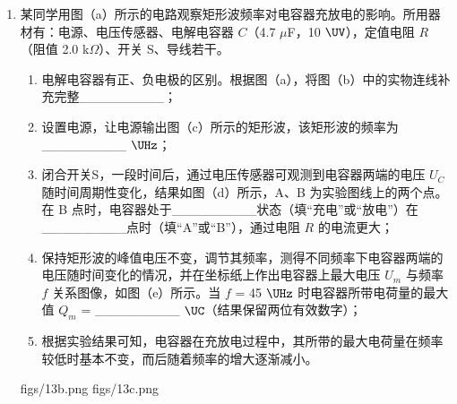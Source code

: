 \documentclass[\gkver]{gaokaozhenti}
\begin{document}
\begin{enumerate}
{ $v_{A}=\frac{d}{\Delta t_{A}}=\frac{5.25\times10^{-3}}{5.25\times10^{-3}}\Ums=1.00\Ums$

（4）挡光片依次经过光电门 A 和 B，由动能定理可得

 $\frac{1}{2}mv_{B}^{2}-\frac{1}{2}mv_{A}^{2}=mgL\sin\theta-\mu mgL\cos\theta$

解得  $\mu = \tan\theta - \frac{v_{B}^{2} - v_{A}^{2}}{2gL\cos\theta}$

（6）根据图像可知，动摩擦因数并不随角度的变化而发生变化，所以可以得到的结论为斜面倾角对动摩擦因数没有影响。
}

\item
某同学用图（a）所示的电路观察矩形波频率对电容器充放电的影响。所用器材有：电源、电压传感器、电解电容器 $C$（4.7 $\mu$F，10 $\UV$），定值电阻 $R$（阻值 2.0 k$\Omega$）、开关 S、导线若干。
\begin{enumerate}
	\item
	电解电容器有正、负电极的区别。根据图（a），将图（b）中的实物连线补充完整\_\_\_\_\_\_\_\_\_；
	\item
	设置电源，让电源输出图（c）所示的矩形波，该矩形波的频率为\_\_\_\_\_\_\_\_\_ $\UHz$；
	\item
	闭合开关S，一段时间后，通过电压传感器可观测到电容器两端的电压 $U_{C}$ 随时间周期性变化，结果如图（d）所示，A、B 为实验图线上的两个点。在 B 点时，电容器处于\_\_\_\_\_\_\_\_\_状态（填“充电”或“放电”）在\_\_\_\_\_\_\_\_\_点时（填“A”或“B”），通过电阻 $R$ 的电流更大；
	\item
	保持矩形波的峰值电压不变，调节其频率，测得不同频率下电容器两端的电压随时间变化的情况，并在坐标纸上作出电容器上最大电压 $U_{m}$ 与频率 $f$ 关系图像，如图（e）所示。当 $f$ = 45 $\UHz$ 时电容器所带电荷量的最大值 $Q_{m}$ = \_\_\_\_\_\_\_\_\_ $\UC$（结果保留两位有效数字）；
	\item
	根据实验结果可知，电容器在充放电过程中，其所带的最大电荷量在频率较低时基本不变，而后随着频率的增大逐渐减小。
\end{enumerate}
{figs/13b.png}
{figs/13c.png}
\end{enumerate}
\end{document}
